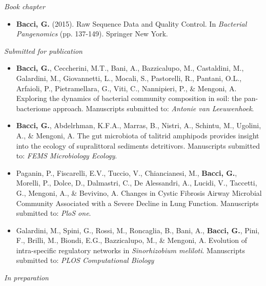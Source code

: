 \noindent \textit{Book chapter}
\begin{itemize}

\item \textbf{Bacci, G.} (2015). Raw Sequence Data and Quality Control. In \textit{Bacterial Pangenomics} (pp. 137-149). Springer New York.

\end{itemize}


\noindent \textit{Submitted for publication}

\begin{itemize}

\item \textbf{Bacci, G.}, Ceccherini, M.T., Bani, A., Bazzicalupo, M., Castaldini, M., Galardini, M., Giovannetti, L., Mocali, S., Pastorelli, R., Pantani, O.L., Arfaioli, P., Pietramellara, G., Viti, C., Nannipieri, P., \& Mengoni, A. Exploring the dynamics of bacterial community composition in soil: the pan-bacteriome approach. Manuscripts submitted to: \textit{Antonie van Leeuwenhoek}.

\item \textbf{Bacci, G.}, Abdelrhman, K.F.A., Marras, B., Nistri, A., Schintu, M., Ugolini, A., \& Mengoni, A. The gut microbiota of talitrid amphipods provides insight into the ecology of supralittoral sediments detritivors. Manuscripts submitted to: \textit{FEMS Microbiology Ecology}.

\item Paganin, P., Fiscarelli, E.V., Tuccio, V., Chiancianesi, M., \textbf{Bacci, G.}, Morelli, P., Dolce, D., Dalmastri, C., De Alessandri, A., Lucidi, V., Taccetti, G., Mengoni, A., \& Bevivino, A. Changes in Cystic Fibrosis Airway Microbial Community Associated with a Severe Decline in Lung Function. Manuscripts submitted to: \textit{PloS one}.

\item Galardini, M., Spini, G., Rossi, M., Roncaglia, B., Bani, A., \textbf{Bacci, G.}, Pini, F., Brilli, M., Biondi, E.G., Bazzicalupo, M., \& Mengoni, A. Evolution of intra-specific regulatory networks in \textit{Sinorhizobium meliloti}. Manuscripts submitted to: \textit{PLOS Computational Biology}

\end{itemize}


\textit{In preparation}

